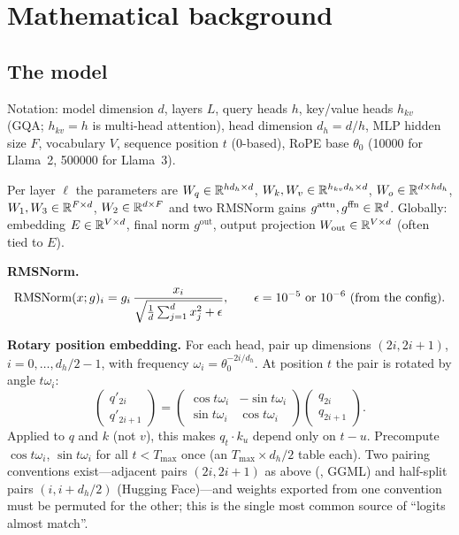 \section{Mathematical background}

\subsection{The model}

Notation: model dimension $d$, layers $L$, query heads $h$, key/value heads $h_{kv}$ (GQA; $h_{kv} = h$ is multi-head attention), head dimension $d_h = d/h$, MLP hidden size $F$, vocabulary $V$, sequence position $t$ (0-based), RoPE base $\theta_0$ (10000 for Llama~2, 500000 for Llama~3).

Per layer $\ell$ the parameters are $W_q\in\mathbb{R}^{hd_h\times d}$, $W_k, W_v\in\mathbb{R}^{h_{kv}d_h\times d}$, $W_o\in\mathbb{R}^{d\times hd_h}$, $W_1,W_3\in\mathbb{R}^{F\times d}$, $W_2\in\mathbb{R}^{d\times F}$ and two RMSNorm gains $g^{\text{attn}}, g^{\text{ffn}}\in\mathbb{R}^d$. Globally: embedding $E\in\mathbb{R}^{V\times d}$, final norm $g^{\text{out}}$, output projection $W_{\text{out}}\in\mathbb{R}^{V\times d}$ (often tied to $E$).

\textbf{RMSNorm.}
\begin{equation}
\operatorname{RMSNorm}(x; g)_i = g_i \,\frac{x_i}{\sqrt{\tfrac{1}{d}\sum_{j=1}^d x_j^2 + \epsilon}},\qquad \epsilon = 10^{-5}\text{ or }10^{-6}\text{ (from the config)}.
\end{equation}

\textbf{Rotary position embedding.} For each head, pair up dimensions $(2i, 2i+1)$, $i=0,\dots,d_h/2-1$, with frequency $\omega_i = \theta_0^{-2i/d_h}$. At position $t$ the pair is rotated by angle $t\omega_i$:
\begin{equation}
\begin{pmatrix} q'_{2i}\\ q'_{2i+1}\end{pmatrix} =
\begin{pmatrix} \cos t\omega_i & -\sin t\omega_i\\ \sin t\omega_i & \cos t\omega_i\end{pmatrix}
\begin{pmatrix} q_{2i}\\ q_{2i+1}\end{pmatrix}.
\end{equation}
Applied to $q$ and $k$ (not $v$), this makes $q_t\cdot k_u$ depend only on $t-u$. Precompute $\cos t\omega_i$, $\sin t\omega_i$ for all $t<T_{\max}$ once (an $T_{\max}\times d_h/2$ table each). Two pairing conventions exist---adjacent pairs $(2i,2i+1)$ as above (, GGML) and half-split pairs $(i, i+d_h/2)$ (Hugging Face)---and weights exported from one convention must be permuted for the other; this is the single most common source of ``logits almost match''.

